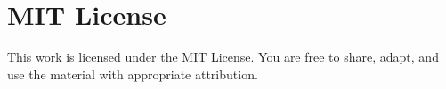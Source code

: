 \section*{MIT License}
This work is licensed under the MIT License. You are free to share, adapt,
 and use the material with appropriate attribution.


